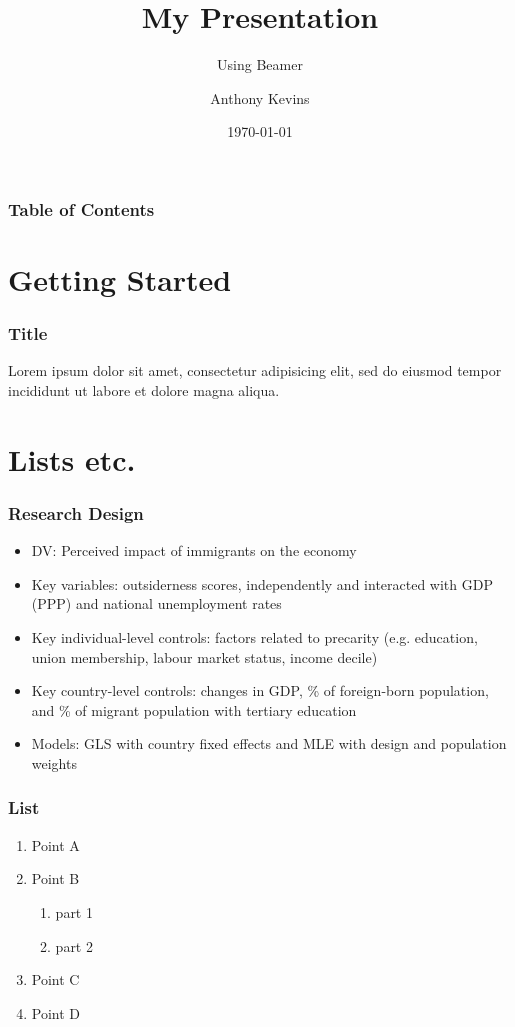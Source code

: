 \documentclass[14pt]{beamer}
\title{My Presentation}
\subtitle{Using Beamer}
\author{Anthony Kevins}
\institute{School of Governance\\
	Utrecht University}
\date{\today}
\begin{document}
\begin{frame}
\titlepage
\end{frame}

\begin{frame}
\frametitle{Table of Contents}

\tableofcontents
\end{frame}


\section{Getting Started}

\begin{frame}
\frametitle{Title}
Lorem ipsum dolor sit amet, consectetur adipisicing elit, sed do eiusmod tempor incididunt ut labore et dolore magna aliqua.
\end{frame}


\section{Lists etc.}
\begin{frame}
	\frametitle{Research Design}
	\begin{itemize}[<+-| alert@+>]
		\item<1-> \alert<+>{DV:} Perceived impact of immigrants on the economy
		\item<2-> \alert<+>{Key variables:} outsiderness scores, independently and interacted with GDP (PPP) and national unemployment rates
		\item<3-> \alert<+>{Key individual-level controls:} factors related to precarity (e.g. education, union membership, labour market status, income decile)
		\item<4-> \alert<+>{Key country-level controls:} changes in GDP, \% of foreign-born population, and \% of migrant population with tertiary education
		\item<5-> \alert<+>{Models:} GLS with country fixed effects and MLE with design and population weights
	\end{itemize}
\end{frame}

\begin{frame}
\frametitle{List}
\begin{enumerate}[I]
	\item Point A
	\item Point B
	\begin{enumerate}[i]
		\item part 1
		\item part 2
	\end{enumerate}
	\item Point C
	\item Point D
\end{enumerate}
\end{frame}
\end{document}
